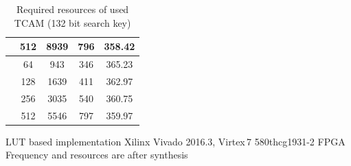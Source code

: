 \begin{frame}[allowframebreaks]
\begin{table}
\begin{tabular}{|c|c||c|c|c|}
        	                                  &         512         &     8939     &      796       &        358.42         \\ \hline
        	      \T\multirow{4}{*}{4}        &         64          &     943      &      346       &        365.23         \\
        	                                  &         128         &     1639     &      411       &        362.97         \\
        	                                  &         256         &     3035     &      540       &        360.75         \\
        	                                  &         512         &     5546     &      797       &        359.97         \\ \hline
        \end{tabular}
        \caption{Required resources of used TCAM (132 bit search key)}
     \end{table}
     \vspace*{-1px}
     \begin{minipage}{\textwidth}
          \begin{itemize}
              \fitem LUT based implementation
              \fitem Xilinx Vivado 2016.3, Virtex\,7 580thcg1931-2 FPGA
              \fitem Frequency and resources are after synthesis
          \end{itemize}
     \end{minipage}
\end{frame}

